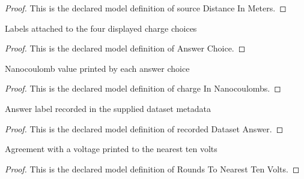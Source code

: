 \begin{proof}
  This is the declared model definition of source Distance In Meters.
\end{proof}
\begin{definition}
  \label{def:physics:phyx-mini-0860:phyxminiproblems-problemphyxmini0860-answerchoice}
  Labels attached to the four displayed charge choices
\end{definition}
\begin{proof}
  This is the declared model definition of Answer Choice.
\end{proof}
\begin{definition}
  \label{def:physics:phyx-mini-0860:phyxminiproblems-problemphyxmini0860-answerchoice-chargeinnanocoulombs}
  Nanocoulomb value printed by each answer choice
\end{definition}
\begin{proof}
  This is the declared model definition of charge In Nanocoulombs.
\end{proof}
\begin{definition}
  \label{def:physics:phyx-mini-0860:phyxminiproblems-problemphyxmini0860-recordeddatasetanswer}
  Answer label recorded in the supplied dataset metadata
\end{definition}
\begin{proof}
  This is the declared model definition of recorded Dataset Answer.
\end{proof}
\begin{definition}
  \label{def:physics:phyx-mini-0860:phyxminiproblems-problemphyxmini0860-roundstonearesttenvolts}
  Agreement with a voltage printed to the nearest ten volts
\end{definition}
\begin{proof}
  This is the declared model definition of Rounds To Nearest Ten Volts.
\end{proof}
